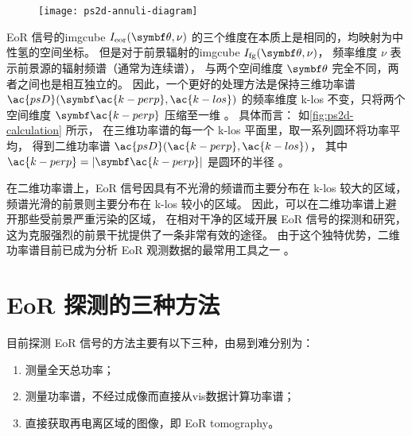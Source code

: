 \begin{figure}[htp]
  \centering
  \texttt{[image: ps2d-annuli-diagram]}
  \label{fig:ps2d-calculation}
\end{figure}

EoR 信号的\ac{imgcube} $I_{\R{eor}}(\B{\theta}, \nu)$
的三个维度在本质上是相同的，均映射为中性氢的空间坐标。
但是对于前景辐射的\ac{imgcube} $I_{\R{fg}}(\B{\theta}, \nu)$，
频率维度 $\nu$ 表示前景源的辐射频谱（通常为连续谱），
与两个空间维度 $\B{\theta}$ 完全不同，两者之间也是相互独立的。
因此，一个更好的处理方法是保持三维功率谱 $\ac{psD}(\B{\ac{k-perp}}, \ac{k-los})$
的频率维度 \ac{k-los} 不变，只将两个空间维度 $\B{\ac{k-perp}}$ 压缩至一维
\cite{datta2010}。
具体而言：
如\autoref{fig:ps2d-calculation} 所示，
在三维功率谱的每一个 \ac{k-los} 平面里，取一系列圆环将功率平均，
得到二维功率谱 $\ac{psD}(\ac{k-perp}, \ac{k-los})$，
其中 $\ac{k-perp} = |\B{\ac{k-perp}}|$ 是圆环的半径
\cite{thyagarajan2013}。

在二维功率谱上，EoR 信号因具有不光滑的频谱而主要分布在 \ac{k-los} 较大的区域，
频谱光滑的前景则主要分布在 \ac{k-los} 较小的区域。
因此，可以在二维功率谱上避开那些受前景严重污染的区域，
在相对干净的区域开展 EoR 信号的探测和研究，
这为克服强烈的前景干扰提供了一条非常有效的途径。
由于这个独特优势，二维功率谱目前已成为分析 EoR 观测数据的最常用工具之一
\cite{trott2012,thyagarajan2013,barry2016,beardsley2016,trott2016,patil2017}。


\section{EoR 探测的三种方法}
\label{sec:det-methods}

目前探测 EoR 信号的方法主要有以下三种，由易到难分别为：
\begin{enumerate}
  \item 测量全天总功率；
  \item 测量功率谱，不经过成像而直接从\ac{vis}数据计算功率谱；
  \item 直接获取再电离区域的图像，即 EoR \ac{tomography}。
\end{enumerate}

